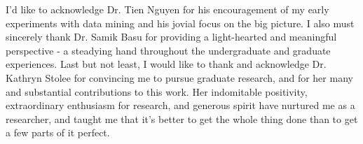 \cleardoublepage {}
{}

I'd like to acknowledge Dr. Tien Nguyen for his encouragement of my early experiments with data mining and his jovial focus on the big picture.  I also must sincerely thank Dr. Samik Basu for providing a light-hearted and meaningful perspective - a steadying hand throughout the undergraduate and graduate experiences. Last but not least, I would like to thank and acknowledge Dr. Kathryn Stolee for convincing me to pursue graduate research, and for her many and substantial contributions to this work.  Her indomitable positivity, extraordinary enthusiasm for research, and generous spirit have nurtured me as a researcher, and taught me that it's better to get the whole thing done than to get a few parts of it perfect.
